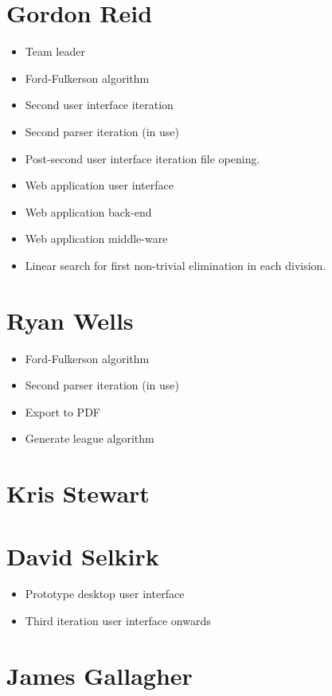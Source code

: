 \section{Gordon Reid}

\begin{itemize}
\item Team leader
\item Ford-Fulkerson algorithm
\item Second user interface iteration
\item Second parser iteration (in use)
\item Post-second user interface iteration file opening.
\item Web application user interface
\item Web application back-end
\item Web application middle-ware
\item Linear search for first non-trivial elimination in each division.
\end{itemize}

\section{Ryan Wells}

\begin{itemize}
\item Ford-Fulkerson algorithm
\item Second parser iteration (in use)
\item Export to PDF
\item Generate league algorithm
\end{itemize}

\section{Kris Stewart}

\section{David Selkirk}

\begin{itemize}
\item Prototype desktop user interface
\item Third iteration user interface onwards
\end{itemize}

\section{James Gallagher}
